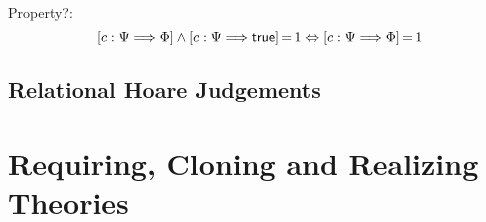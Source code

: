 Property?:
\begin{displaymath}
\left[{c}:{\Psi}\Longrightarrow{\Phi}\right] \land {\left[{c}:{\Psi}\Longrightarrow{\mathsf{true}}\right]}\,{=}\,{1}
\Leftrightarrow
{\left[{c}:{\Psi}\Longrightarrow{\Phi}\right]}\,{=}\,{1}
\end{displaymath}


\subsection{Relational Hoare Judgements}

\section{Requiring, Cloning and Realizing Theories\label{sec:cloning}}





